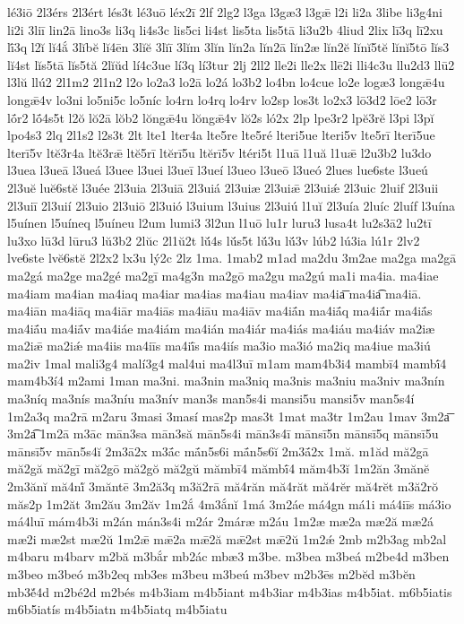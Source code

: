 {lé3iō
2l3érs
2l3ért
lés3t
lé3uō
léx2ī
2lf
2lg2
l3ga
l3gæ3
l3gǣ
l2i
li2a
3libe
li3g4ni
li2i
3liī
lin2ā
lino3s
li3q
li4s3c
lis5ci
li4st
lis5ta
lis5tā
li3u2b
4liud
2lix
lī3q
lī2xu
lī́3q
l2ĭ
lĭ4ắ
3lĭbĕ
lĭ4ēn
3lĭĕ
3lĭī
3lĭm
3lĭn
lĭn2a
lĭn2ā
lĭn2æ
lĭn2ĕ
lĭnĭ5tĕ
lĭnĭ5tō
lĭs3
lĭ4st
lĭs5tā
lĭs5tă
2lĭŭd
lí4c3ue
lí3q
lí3tur
2lj
2ll2
lle2i
lle2x
llē2i
lli4c3u
llu2d3
llū2
l3lŭ
llú2
2l1m2
2l1n2
l2o
lo2a3
lo2ā
lo2á
lo3b2
lo4bn
lo4cue
lo2e
logæ3
longǣ4u
longǣ4v
lo3ni
lo5ni5c
lo5níc
lo4rn
lo4rq
lo4rv
lo2sp
los3t
lo2x3
lō3d2
lōe2
lō3r
lṓr2
lṓ4s5t
l2ŏ
lŏ2ā
lŏb2
lŏngǣ4u
lŏngǣ4v
lŏ2s
ló2x
2lp
lpe3r2
lpĕ3rĕ
l3pi
l3pĭ
lpo4s3
2lq
2l1s2
l2s3t
2lt
lte1
lter4a
lte5re
lte5ré
lteri5ue
lteri5v
lte5rī
lterī5ue
lterī5v
ltĕ3r4a
ltĕ3rǣ
ltĕ5rī
ltĕrī5u
ltĕrī5v
ltéri5t
l1uā
l1uă
l1uǣ
l2u3b2
lu3do
l3uea
l3ueā
l3ueá
l3uee
l3uei
l3ueī
l3ueí
l3ueo
l3ueō
l3ueó
2lues
lue6ste
l3ueú
2l3uĕ
luĕ6stĕ
l3uée
2l3uia
2l3uiā
2l3uiá
2l3uiæ
2l3uiǣ
2l3uiǽ
2l3uic
2luif
2l3uii
2l3uiī
2l3uií
2l3uio
2l3uiō
2l3uió
l3uium
l3uius
2l3uiú
l1uĭ
2l3uía
2luíc
2luíf
l3uína
l5uínen
l5uíneq
l5uíneu
l2um
lumi3
3l2un
l1uō
lu1r
luru3
lusa4t
lu2s3ā2
lu2tī
lu3xo
lū3d
lūru3
lŭ3b2
2lŭc
2l1ŭ2t
lŭ́4s
lŭ́s5t
lŭ́3u
lŭ́3v
lúb2
lú3ia
lú1r
2lv2
lve6ste
lvĕ6stĕ
2l2x2
lx3u
lý2c
2lz
1ma.
1mab2
m1ad
ma2du
3m2ae
ma2ga
ma2gā
ma2gá
ma2ge
ma2gé
ma2gī
ma4g3n
ma2gō
ma2gu
ma2gú
ma1i
ma4ia.
ma4iae
ma4iam
ma4ian
ma4iaq
ma4iar
ma4ias
ma4iau
ma4iav
ma4ia͞
ma4ia͡
ma4iā.
ma4iān
ma4iāq
ma4iār
ma4iās
ma4iāu
ma4iāv
ma4iā́n
ma4iā́q
ma4iā́r
ma4iā́s
ma4iā́u
ma4iā́v
ma4iáe
ma4iám
ma4ián
ma4iár
ma4iás
ma4iáu
ma4iáv
ma2iæ
ma2iǣ
ma2iǽ
ma4iis
ma4iīs
ma4iī́s
ma4iís
ma3io
ma3ió
ma2iq
ma4iue
ma3iú
ma2iv
1mal
mali3g4
malí3g4
mal4ui
ma4l3uī
m1am
mam4b3i4
mambī4
mambī́4
mam4b3í4
m2ami
1man
ma3ni.
ma3nin
ma3niq
ma3nis
ma3niu
ma3niv
ma3nín
ma3níq
ma3nís
ma3níu
ma3nív
man3s
man5s4i
mansi5u
mansi5v
man5s4í
1m2a3q
ma2rā
m2aru
3masi
3masí
mas2p
mas3t
1mat
ma3tr
1m2au
1mav
3m2a͞
3m2a͡
1m2ā
m3āc
mān3sa
mān3să
mān5s4i
mān3s4ī
mānsī5n
mānsī5q
mānsī5u
mānsī5v
mān5s4ĭ
2m3ā2x
m3ā́c
mā́n5s6i
mā́n5s6ĭ
2m3ā́2x
1mă.
m1ăd
mă2gā
mă2gă
mă2gī
mă2gō
mă2gŏ
mă2gŭ
mămbī4
mămbī́4
măm4b3ĭ
1m2ăn
3mănĕ
2m3ănĭ
mă4nĭ́
3măntē
3m2ă3q
m3ă2rā
mă4răn
mă4răt
mă4rĕr
mă4rĕt
m3ă2rŏ
măs2p
1m2ăt
3m2ău
3m2ăv
1m2ắ
4m3ắnĭ
1má
3m2áe
má4gn
má1i
má4iīs
má3io
má4luī
mám4b3i
m2án
mán3s4i
m2ár
2máræ
m2áu
1m2æ
mæ2a
mæ2ă
mæ2á
mæ2i
mæ2st
mæ2ŭ
1m2ǣ
mǣ2a
mǣ2ă
mǣ2st
mǣ2ŭ
1m2ǽ
2mb
m2b3ag
mb2al
m4baru
m4barv
m2bă
m3bắr
mb2ác
mbæ3
m3be.
m3bea
m3beá
m2be4d
m3ben
m3beo
m3beó
m3b2eq
mb3es
m3beu
m3beú
m3bev
m2b3ēs
m2bĕd
m3bĕn
mb3ĕ́4d
m2bé2d
m2bés
m4b3iam
m4b5iant
m4b3iar
m4b3ias
m4b5iat.
m6b5iatis
m6b5iatís
m4b5iatn
m4b5iatq
m4b5iatu
}
